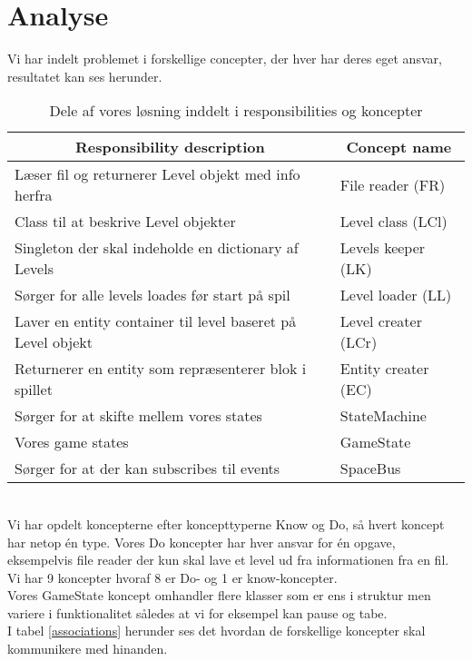 \section{Analyse}
Vi har indelt problemet i forskellige concepter, der hver har deres eget ansvar, resultatet kan ses herunder.\\
\begin{table}[!h]
\centering
\begin{tabular}{|l|l|}
\hline
\multicolumn{1}{|c|}{\textbf{Responsibility description}}            & \multicolumn{1}{c|}{\textbf{Concept name}} \\ \hline
Læser fil og returnerer Level objekt med info herfra        & File reader (FR)                       \\ \hline
Class til at beskrive Level objekter                        & Level class (LCl)                       \\ \hline
Singleton der skal indeholde en dictionary af Levels        & Levels keeper (LK)                    \\ \hline
Sørger for alle levels loades før start på spil             & Level loader (LL)                     \\ \hline
Laver en entity container til level baseret på Level objekt & Level creater (LCr)                     \\ \hline
Returnerer en entity som repræsenterer blok i spillet       & Entity creater (EC)                    \\ \hline
Sørger for at skifte mellem vores states & StateMachine \\ \hline
Vores game states & GameState\\ \hline
Sørger for at der kan subscribes til events & SpaceBus\\ \hline
\end{tabular}
\caption{Dele af vores løsning inddelt i responsibilities og koncepter}
\label{responsibilities}
\end{table}\\
Vi har opdelt koncepterne efter koncepttyperne Know og Do, så hvert koncept har netop én type. Vores Do koncepter har hver ansvar for én opgave, eksempelvis file reader der kun skal lave et level ud fra informationen fra en fil. Vi har 9 koncepter hvoraf 8 er Do- og 1 er know-koncepter.\\
Vores GameState koncept omhandler flere klasser som er ens i struktur men variere i funktionalitet således at vi for eksempel kan pause og tabe.\\
I tabel \ref{associations} herunder ses det hvordan de forskellige koncepter skal kommunikere med hinanden.
